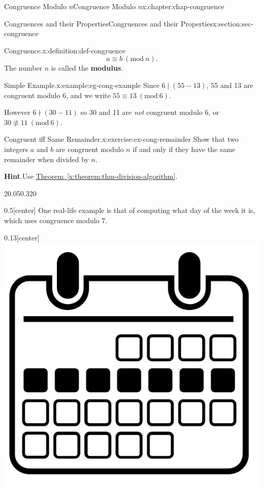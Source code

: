 \documentclass[oneside,10pt,]{book}
\newcommand{\blocktitlefont}{\relax}
\newcommand{\xreffont}{\relax}
\newcommand{\terminology}[1]{\textbf{#1}}
\numberwithin{equation}{section}
\newcommand{\Mod}[1]{\ \left(\mathrm{mod}\ #1\right)}
\begin{document}
\begin{chapterptx}{Congruence Modulo \(n\)}{}{Congruence Modulo \(n\)}{}{}{x:chapter:chap-congruence}
\begin{sectionptx}{Congruences and their Properties}{}{Congruences and their Properties}{}{}{x:section:sec-congruence}
\begin{definition}{Congruence.}{x:definition:def-congruence}
\begin{equation*}
a \equiv b \Mod{n}\text{.}
\end{equation*}
The number \(n\) is called the \terminology{modulus}. \label{g:notation:id235986}%
\end{definition}
\begin{example}{Simple Example.}{x:example:eg-cong-example}%
Since \(6 \mid (55-13)\), 55 and 13 are congruent modulo 6, and we write \(55 \equiv 13 \Mod{6}\).%
\par
However \(6 \nmid (30-11)\) so 30 and 11 are \emph{not} congruent modulo 6, or \(30 \not\equiv 11 \Mod{6}\).%
\end{example}
\begin{inlineexercise}{Congruent iff Same Remainder.}{x:exercise:ex-cong-remainder}%
Show that two integers \(a\) and \(b\) are congruent modulo \(n\) if and only if they have the same remainder when divided by \(n\).%
\par\smallskip%
\noindent\textbf{\blocktitlefont Hint}.\hypertarget{g:hint:id236488}{}\quad{}Use \hyperref[x:theorem:thm-division-algorithm]{Theorem~{\xreffont\ref{x:theorem:thm-division-algorithm}}}.%
\end{inlineexercise}
\begin{sidebyside}{2}{0.05}{0.32}{0}%
\begin{sbspanel}{0.5}[center]%
One real-life example is that of computing what day of the week it is, which uses congruence modulo \(7\).%
\end{sbspanel}%
\begin{sbspanel}{0.13}[center]%
\includegraphics[width=\linewidth]{figs/noun_week_247256.png}

\end{sbspanel}
\end{sidebyside}
\end{sectionptx}
\end{chapterptx}
\end{document}

